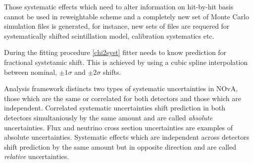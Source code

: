 Those systematic effects which need to alter information on hit-by-hit basis cannot be used in reweightable scheme 
and a completely new set of Monte Carlo simulation files is generated, for instance, new sets of files are requered for 
systematically shifted scintillation model, calibration systematics etc. 

During the fitting procedure \ref{chi2syst} fitter needs to know prediction for fractional systetamic shift. This is 
achieved by using a cubic spline interpolation between nominal, $\pm 1\sigma$ and $\pm 2\sigma$ shifts. 

Analysis framework distincts two types of systematic uncertainties in NOvA, those which are the same or correlated for 
both detectors and those which are independent. Correlated systematic uncertainties shift prediction in both detectors
simultaniously by the same amount and are called \textit{absolute} uncertainties. Flux and neutrino cross section 
uncertainties are examples of absolute uncertainties. Systematic effects which are independent across detectors 
shift prediction by the same amount but in opposite direction and are called \textit{relative} uncertainties.  

